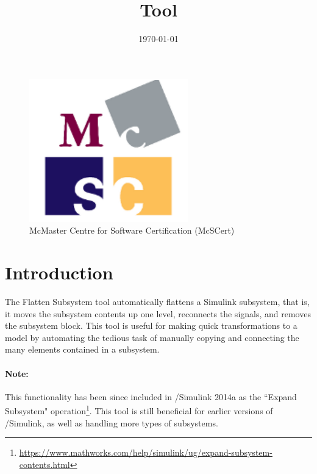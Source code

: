 \documentclass{article}
\title{\ToolName Tool}
\date{\monthyeardate\today}
\makeatletter
\newcommand{\ToolName}{Flatten Subsystem\@\xspace}
\makeatother
\begin{document}
\maketitle
\vfill

\begin{figure}
	\centering
	\includegraphics[]{../figs/McSCert_Logo.pdf} \\
	McMaster Centre for Software Certification (McSCert)
\end{figure}

\newpage

\tableofcontents
\newpage

\section{Introduction}

The \ToolName tool automatically flattens a Simulink subsystem, that is, it moves the subsystem contents up one level, reconnects the signals, and removes the subsystem block. This tool is useful for making quick transformations to a model by automating the tedious task of manually copying and connecting the many elements contained in a subsystem.

\paragraph*{Note:} This functionality has been since included in \matlab/Simulink 2014a as the ``Expand Subsystem" operation\footnote{\url{https://www.mathworks.com/help/simulink/ug/expand-subsystem-contents.html}}. This tool is still beneficial for earlier versions of \matlab/Simulink, as well as handling more types of subsystems.
\end{document}
